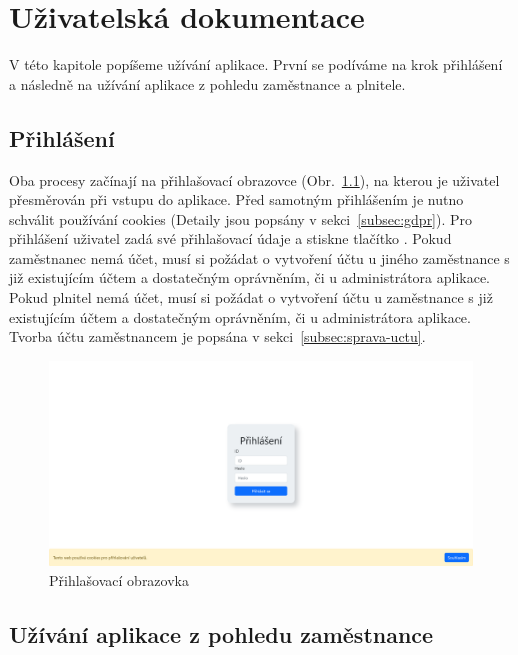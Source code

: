 \chapter{Uživatelská dokumentace}\label{ch:uzivatelska-dokumentace}

V této kapitole popíšeme užívání aplikace.
První se podíváme na krok přihlášení a následně na užívání aplikace z pohledu zaměstnance a plnitele.

\section{Přihlášení}\label{sec:prihlaseni}

Oba procesy začínají na přihlašovací obrazovce (Obr.~\ref{fig:login-screenshot}), na kterou je uživatel přesměrován při vstupu do aplikace.
Před samotným přihlášením je nutno schválit používání cookies (Detaily jsou popsány v sekci~\ref{subsec:gdpr}).
Pro přihlášení uživatel zadá své přihlašovací údaje a stiskne tlačítko .
Pokud zaměstnanec nemá účet, musí si požádat o vytvoření účtu u jiného zaměstnance s již existujícím účtem a dostatečným oprávněním, či u administrátora aplikace.
Pokud plnitel nemá účet, musí si požádat o vytvoření účtu u zaměstnance s již existujícím účtem a dostatečným oprávněním, či u administrátora aplikace.
Tvorba účtu zaměstnancem je popsána v sekci~\ref{subsec:sprava-uctu}.

\begin{figure}[H]
    \includegraphics[width=\textwidth]{../img/screenshots/login}
    \caption{Přihlašovací obrazovka}\label{fig:login-screenshot}
\end{figure}


\section{Užívání aplikace z pohledu zaměstnance}\label{sec:uzivani-aplikace-z-pohledu-zamestnance}

